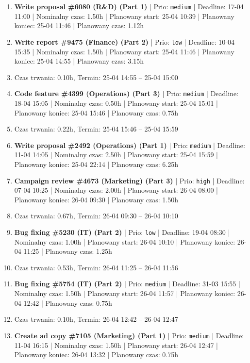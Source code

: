 {\begin{enumerate}
  \item [\textbf{14669}] \textbf{Write proposal \#6080 (R\&D) (Part 1)} | Prio: \texttt{medium} | Deadline: 17-04 11:00 | Nominalny czas: 1.50h | Planowany start: 25-04 10:39 | Planowany koniec: 25-04 11:46 | Planowany czas: 1.12h
  \item [\textbf{14685}] \textbf{Write report \#9475 (Finance) (Part 2)} | Prio: \texttt{low} | Deadline: 10-04 15:35 | Nominalny czas: 1.50h | Planowany start: 25-04 11:46 | Planowany koniec: 25-04 14:55 | Planowany czas: 3.15h
  \item [\textbf{PRZERWA}] Czas trwania: 0.10h, Termin: 25-04 14:55 -- 25-04 15:00
  \item [\textbf{14664}] \textbf{Code feature \#4399 (Operations) (Part 3)} | Prio: \texttt{medium} | Deadline: 18-04 15:05 | Nominalny czas: 0.50h | Planowany start: 25-04 15:01 | Planowany koniec: 25-04 15:46 | Planowany czas: 0.75h
  \item [\textbf{PRZERWA}] Czas trwania: 0.22h, Termin: 25-04 15:46 -- 25-04 15:59
  \item [\textbf{14668}] \textbf{Write proposal \#2492 (Operations) (Part 1)} | Prio: \texttt{medium} | Deadline: 11-04 14:05 | Nominalny czas: 2.50h | Planowany start: 25-04 15:59 | Planowany koniec: 25-04 22:14 | Planowany czas: 6.25h
  \item [\textbf{14625}] \textbf{Campaign review \#4673 (Marketing) (Part 3)} | Prio: \texttt{high} | Deadline: 07-04 10:25 | Nominalny czas: 2.00h | Planowany start: 26-04 08:00 | Planowany koniec: 26-04 09:30 | Planowany czas: 1.50h
  \item [\textbf{PRZERWA}] Czas trwania: 0.67h, Termin: 26-04 09:30 -- 26-04 10:10
  \item [\textbf{14680}] \textbf{Bug fixing \#5230 (IT) (Part 2)} | Prio: \texttt{low} | Deadline: 19-04 08:30 | Nominalny czas: 1.00h | Planowany start: 26-04 10:10 | Planowany koniec: 26-04 11:25 | Planowany czas: 1.25h
  \item [\textbf{PRZERWA}] Czas trwania: 0.53h, Termin: 26-04 11:25 -- 26-04 11:56
  \item [\textbf{14631}] \textbf{Bug fixing \#5754 (IT) (Part 2)} | Prio: \texttt{medium} | Deadline: 31-03 15:55 | Nominalny czas: 1.50h | Planowany start: 26-04 11:57 | Planowany koniec: 26-04 12:42 | Planowany czas: 0.75h
  \item [\textbf{PRZERWA}] Czas trwania: 0.10h, Termin: 26-04 12:42 -- 26-04 12:47
  \item [\textbf{14650}] \textbf{Create ad copy \#7105 (Marketing) (Part 1)} | Prio: \texttt{medium} | Deadline: 11-04 16:15 | Nominalny czas: 1.50h | Planowany start: 26-04 12:47 | Planowany koniec: 26-04 13:32 | Planowany czas: 0.75h

\end{enumerate}}
